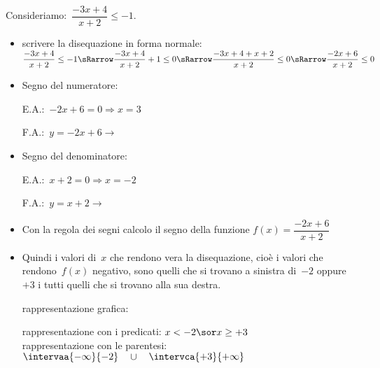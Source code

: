  \begin{esempio}{}{}
Consideriamo:~\(\dfrac{-3 x +4}{x+2} \le -1\).
\begin{itemize} [noitemsep]
 \item scrivere la disequazione in forma normale:\\ [.5em]
 \(\dfrac{-3 x +4}{x+2} \le -1 \sRarrow \dfrac{-3 x +4}{x+2} +1 \le 0 
\sRarrow
 \dfrac{-3 x +4 + x +2}{x+2} \le 0 \sRarrow \dfrac{-2 x +6}{x+2} \le 0\)\\
 \item Segno del numeratore:\\
 \begin{minipage}{.45\textwidth}
  E.A.:~\(-2 x +6=0 \Rightarrow x=3\)
 \end{minipage}
 \begin{minipage}{.25\textwidth}
  F.A.:~\(y=-2 x +6 \rightarrow \)
 \end{minipage}
 \begin{minipage}{.3\textwidth}
 \end{minipage}
 \item Segno del denominatore:\\
 \begin{minipage}{.45\textwidth}
  E.A.:~\(x + 2=0 \Rightarrow x=-2\)
 \end{minipage}
 \begin{minipage}{.25\textwidth}
  F.A.:~\(y=x +2 \rightarrow \)
 \end{minipage}
 \begin{minipage}{.3\textwidth}
 \end{minipage}
 \item Con la regola dei segni calcolo il segno della funzione 
 \(f(x) = \dfrac{-2 x +6}{x+2}\) 

  \segnofratta
 \item Quindi i valori di~\(x\) che rendono vera la disequazione, cioè i 
valori
  che rendono~\(f(x)\) negativo, sono quelli 
  che si trovano a sinistra di~\(-2\) oppure \(+3\) i tutti quelli che si 
trovano alla sua destra. 
 \subitem 
  \begin{minipage}{.35\textwidth}
   rappresentazione grafica: 
  \end{minipage}
  \begin{minipage}{.30\textwidth}
  \end{minipage}
 \subitem rappresentazione con i predicati: \quad \(x < -2 \sor x \ge +3\) \\
 \subitem rappresentazione con le 
  parentesi: \quad \(\intervaa{-\infty}{-2} \quad \cup \quad 
                     \intervca{+3}{+\infty}\) 
\end{itemize}
 \end{esempio}

